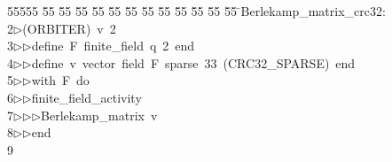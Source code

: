 %
%
\begin{tabbing}
55555 \= 55 \= 55 \= 55 \= 55 \= 55 \= 55 \= 55 \= 55 \= 55 \= 55 \= 55 \= 55 \= \>Berlekamp\_matrix\_crc32:\\[0pt]
2\>$\triangleright$\>(ORBITER)\ v\ 2\ \\[0pt]
3\>$\triangleright$\>$\triangleright$\>define\ F\ finite\_field\ q\ 2\ end\ \\[0pt]
4\>$\triangleright$\>$\triangleright$\>define\ v\ vector\ field\ F\ sparse\ 33\ (CRC32\_SPARSE)\ end\ \\[0pt]
5\>$\triangleright$\>$\triangleright$\>with\ F\ do\ \\[0pt]
6\>$\triangleright$\>$\triangleright$\>finite\_field\_activity\ \\[0pt]
7\>$\triangleright$\>$\triangleright$\>$\triangleright$\>Berlekamp\_matrix\ v\ \\[0pt]
8\>$\triangleright$\>$\triangleright$\>end\\[0pt]
9\>\end{tabbing}
